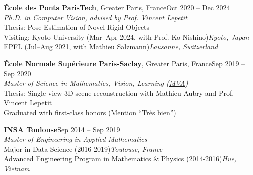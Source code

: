 \documentclass[letterpaper,10pt]{article}
\newlength{\labelcol}
\newcommand{\sublabelfont}{\fontsize{9}{11}\selectfont\itshape}
\newcommand{\labelfont}{\fontsize{9}{11}\selectfont\addfontfeature{LetterSpace=6}}
\newenvironment{cvsection}[2][]{%
  \begin{list}{}{%
    \setlength{\leftmargin}{\labelcol}%
    \setlength{\labelwidth}{\labelcol}%
    \setlength{\labelsep}{0pt}%
    \setlength{\itemsep}{0pt}%
    \setlength{\topsep}{0pt}%
    \setlength{\parsep}{0pt}%
  }%
  \item[{\raisebox{0pt}[0pt][0pt]{\parbox[t]{\labelcol}{\raggedright{\labelfont\MakeUppercase{#2}}\ifx\relax#1\relax\else\\[1pt]{\sublabelfont #1}\fi}}}]%
}{%
  \end{list}%
  \vspace{12pt plus 8pt}%
}
\newcommand{\entry}[3]{%
  {#1}\hfill{#2}\\
  #3\par\vspace{12pt}%
}
\begin{document}
\begin{cvsection}{Education}
\entry{\textbf{\'Ecole des Ponts ParisTech}, Greater Paris, France}{Oct 2020 -- Dec 2024}{%
  \textit{Ph.D. in Computer Vision, advised by \href{https://vincentlepetit.github.io/}{Prof. Vincent Lepetit}}\\
  Thesis: Pose Estimation of Novel Rigid Objects\\
  Visiting: Kyoto University (Mar--Apr 2024, with Prof. Ko Nishino)\hfill\textit{Kyoto, Japan}\\
  \phantom{Visiting: }EPFL (Jul--Aug 2021, with Mathieu Salzmann)\hfill\textit{Lausanne, Switzerland}}

\entry{\textbf{\'Ecole Normale Sup\'erieure Paris-Saclay}, Greater Paris, France}{Sep 2019 -- Sep 2020}{%
  \textit{Master of Science in Mathematics, Vision, Learning (\href{https://www.master-mva.com/}{MVA})}\\
  Thesis: Single view 3D scene reconstruction with Mathieu Aubry and Prof. Vincent Lepetit\\
  Graduated with first-class honors (Mention ``Tr\`es bien'')}

\entry{\textbf{INSA Toulouse}}{Sep 2014 -- Sep 2019}{%
  \textit{Master of Engineering in Applied Mathematics}\\
  Major in Data Science (2016-2019)\hfill\textit{Toulouse, France}\\
  Advanced Engineering Program in Mathematics \& Physics (2014-2016)\hfill\textit{Hue, Vietnam}}
\end{cvsection}
\end{document}
